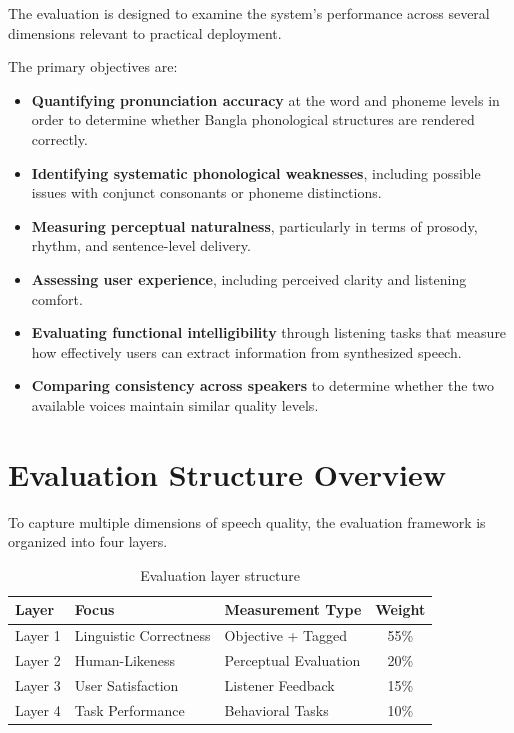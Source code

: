 The evaluation is designed to examine the system's performance across several dimensions relevant to practical deployment.

The primary objectives are:

\begin{itemize}
\item \textbf{Quantifying pronunciation accuracy} at the word and phoneme levels in order to determine whether Bangla phonological structures are rendered correctly.
\item \textbf{Identifying systematic phonological weaknesses}, including possible issues with conjunct consonants or phoneme distinctions.
\item \textbf{Measuring perceptual naturalness}, particularly in terms of prosody, rhythm, and sentence-level delivery.
\item \textbf{Assessing user experience}, including perceived clarity and listening comfort.
\item \textbf{Evaluating functional intelligibility} through listening tasks that measure how effectively users can extract information from synthesized speech.
\item \textbf{Comparing consistency across speakers} to determine whether the two available voices maintain similar quality levels.
\end{itemize}

\section{Evaluation Structure Overview}

To capture multiple dimensions of speech quality, the evaluation framework is organized into four layers.

\begin{table}[htbp]
\centering
\begin{tabular}{l l l c}
\toprule
Layer & Focus & Measurement Type & Weight \\
\midrule
Layer 1 & Linguistic Correctness & Objective + Tagged & 55\% \\
Layer 2 & Human-Likeness & Perceptual Evaluation & 20\% \\
Layer 3 & User Satisfaction & Listener Feedback & 15\% \\
Layer 4 & Task Performance & Behavioral Tasks & 10\% \\
\bottomrule
\end{tabular}
\caption{Evaluation layer structure}
\label{tab:core_system_layers}
\end{table}

